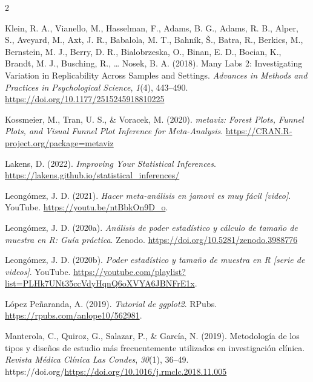 \documentclass[
  bookmarksnumbered]{article}
\newlength{\cslhangindent}
\newlength{\cslentryspacingunit} %
\newenvironment{CSLReferences}[2] %
 {%
  \setlength{\parindent}{0pt}
  \ifodd #1
  \let\oldpar\par
  \def\par{\hangindent=\cslhangindent\oldpar}
  \fi
  \setlength{\parskip}{#2\cslentryspacingunit}
 }%
 {}
\begin{document}
\begin{multicols}{2}
\begin{CSLReferences}{1}{0}
\leavevmode{}%
Klein, R. A., Vianello, M., Hasselman, F., Adams, B. G., Adams, R. B., Alper, S., Aveyard, M., Axt, J. R., Babalola, M. T., Bahník, Š., Batra, R., Berkics, M., Bernstein, M. J., Berry, D. R., Bialobrzeska, O., Binan, E. D., Bocian, K., Brandt, M. J., Busching, R., \ldots{} Nosek, B. A. (2018). Many {Labs} 2: {Investigating Variation} in {Replicability Across Samples} and {Settings}. \emph{Advances in Methods and Practices in Psychological Science}, \emph{1}(4), 443--490. \url{https://doi.org/10.1177/2515245918810225}

\leavevmode{}%
Kossmeier, M., Tran, U. S., \& Voracek, M. (2020). \emph{{metaviz: Forest Plots, Funnel Plots, and Visual Funnel Plot Inference for Meta-Analysis}}. \url{https://CRAN.R-project.org/package=metaviz}

\leavevmode{}%
Lakens, D. (2022). \emph{Improving {Your Statistical Inferences}}. \url{https://lakens.github.io/statistical_inferences/}

\leavevmode{}%
Leongómez, J. D. (2021). \emph{Hacer meta-análisis en jamovi es muy fácil \emph{{[}video{]}}}. YouTube. \url{https://youtu.be/ntBbkOn9D_o}.

\leavevmode{}%
Leongómez, J. D. (2020a). \emph{Análisis de poder estadístico y cálculo de tamaño de muestra en {R}: {Guía} práctica}. {Zenodo}. \url{https://doi.org/10.5281/zenodo.3988776}

\leavevmode{}%
Leongómez, J. D. (2020b). \emph{Poder estadístico y tamaño de muestra en {R} \emph{{[}serie de videos{]}}}. YouTube. \url{https://youtube.com/playlist?list=PLHk7UNt35ccVdyHqnQ6oXVYA6JBNFrE1x}.

\leavevmode{}%
López Peñaranda, A. (2019). \emph{Tutorial de ggplot2}. RPubs. \url{https://rpubs.com/anlope10/562981}.

\leavevmode{}%
Manterola, C., Quiroz, G., Salazar, P., \& García, N. (2019). Metodología de los tipos y diseños de estudio más frecuentemente utilizados en investigación clínica. \emph{Revista Médica Clínica Las Condes}, \emph{30}(1), 36--49. https://doi.org/\url{https://doi.org/10.1016/j.rmclc.2018.11.005}


\end{CSLReferences}
\end{multicols}
\end{document}
